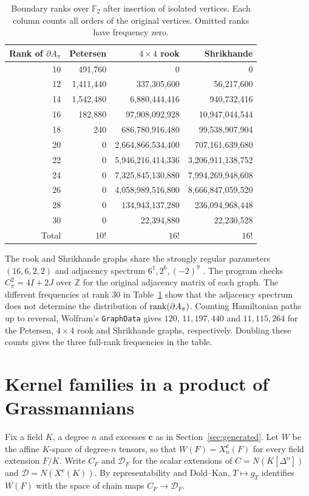 \begin{table}[htb]
\centering\small
\caption{Boundary ranks over $\mathbb F_2$ after insertion of isolated vertices.
Each column counts all orders of the original vertices. Omitted ranks have frequency zero.}
\label{tab:interleaved-ranks}
\begin{tabular}{r|rrr}
Rank of $\partial A_\pi$ & Petersen & $4\times4$ rook & Shrikhande \\ \hline
10 & 491,760 & 0 & 0\\
12 & 1,411,440 & 337,305,600 & 56,217,600\\
14 & 1,542,480 & 6,880,444,416 & 940,732,416\\
16 & 182,880 & 97,908,092,928 & 10,947,044,544\\
18 & 240 & 686,780,916,480 & 99,538,907,904\\
20 & 0 & 2,664,866,534,400 & 707,161,639,680\\
22 & 0 & 5,946,216,414,336 & 3,206,911,138,752\\
24 & 0 & 7,325,845,130,880 & 7,994,269,948,608\\
26 & 0 & 4,058,989,516,800 & 8,666,847,059,520\\
28 & 0 & 134,943,137,280 & 236,094,968,448\\
30 & 0 & 22,394,880 & 22,230,528\\ \hline
Total & $10!$ & $16!$ & $16!$
\end{tabular}
\end{table}

The rook and Shrikhande graphs share the strongly regular parameters
$(16,6,2,2)$ and adjacency spectrum $6^1,2^6,(-2)^9$
\cite{Shrikhande1959}. The program 
checks $C_\pi^2=4I+2J$ over $\mathbb Z$ for the original adjacency matrix of each graph. The different
frequencies at rank $30$ in Table~\ref{tab:interleaved-ranks} show that the adjacency
spectrum does not determine the distribution of $\operatorname{rank}(\partial A_\pi)$.
Counting Hamiltonian paths up to reversal, Wolfram's \texttt{GraphData}
\cite{WolframGraphData} gives $120$, $11{,}197{,}440$ and $11{,}115{,}264$
for the Petersen, $4\times4$ rook and Shrikhande graphs, respectively.
Doubling these counts gives the three full-rank frequencies in the table.



\appendix
\section{Kernel families in a product of Grassmannians}
\label{app:kernel-families}
Fix a field $K$, a degree $n$ and excesses $\mathbf c$ as in
Section~\ref{sec:generated}. Let $W$ be the affine $K$-space of degree-$n$
tensors, so that $W(F)=X^{\mathbf c}_n(F)$ for every field extension $F/K$.
Write $C_F$ and $\mathcal D_F$ for the scalar extensions of $C=N(K[\Delta^n])$
and $\mathcal D=N(X^{\mathbf c}(K))$. By representability and Dold--Kan,
$T\mapsto g_T$ identifies $W(F)$ with the space of chain maps $C_F\to\mathcal D_F$.

